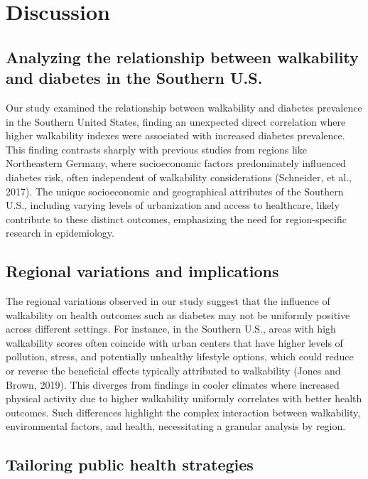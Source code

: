 \documentclass[
]{article}
\begin{document}
\section{Discussion}\label{discussion}

\subsection{Analyzing the relationship between walkability and diabetes
in the Southern
U.S.}\label{analyzing-the-relationship-between-walkability-and-diabetes-in-the-southern-u.s.}

Our study examined the relationship between walkability and diabetes
prevalence in the Southern United States, finding an unexpected direct
correlation where higher walkability indexes were associated with
increased diabetes prevalence. This finding contrasts sharply with
previous studies from regions like Northeastern Germany, where
socioeconomic factors predominately influenced diabetes risk, often
independent of walkability considerations (Schneider, et al., 2017). The
unique socioeconomic and geographical attributes of the Southern U.S.,
including varying levels of urbanization and access to healthcare,
likely contribute to these distinct outcomes, emphasizing the need for
region-specific research in epidemiology.

\subsection{Regional variations and
implications}\label{regional-variations-and-implications}

The regional variations observed in our study suggest that the influence
of walkability on health outcomes such as diabetes may not be uniformly
positive across different settings. For instance, in the Southern U.S.,
areas with high walkability scores often coincide with urban centers
that have higher levels of pollution, stress, and potentially unhealthy
lifestyle options, which could reduce or reverse the beneficial effects
typically attributed to walkability (Jones and Brown, 2019). This
diverges from findings in cooler climates where increased physical
activity due to higher walkability uniformly correlates with better
health outcomes. Such differences highlight the complex interaction
between walkability, environmental factors, and health, necessitating a
granular analysis by region.

\subsection{Tailoring public health
strategies}\label{tailoring-public-health-strategies}
\end{document}
